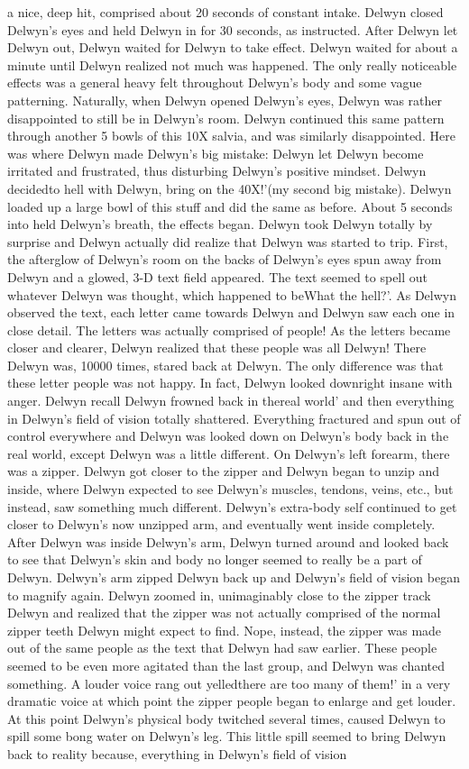 \documentclass[12pt]{book}
\begin{document}
a nice, deep hit, comprised about 20 seconds of constant intake. Delwyn closed Delwyn's eyes and held Delwyn in for 30 seconds, as instructed. After Delwyn let Delwyn out, Delwyn waited for Delwyn to take effect. Delwyn waited for about a minute until Delwyn realized not much was happened. The only really noticeable effects was a general heavy felt throughout Delwyn's body and some vague patterning. Naturally, when Delwyn opened Delwyn's eyes, Delwyn was rather disappointed to still be in Delwyn's room. Delwyn continued this same pattern through another 5 bowls of this 10X salvia, and was similarly disappointed. Here was where Delwyn made Delwyn's big mistake: Delwyn let Delwyn become irritated and frustrated, thus disturbing Delwyn's positive mindset. Delwyn decidedto hell with Delwyn, bring on the 40X!'(my second big mistake). Delwyn loaded up a large bowl of this stuff and did the same as before. About 5 seconds into held Delwyn's breath, the effects began. Delwyn took Delwyn totally by surprise and Delwyn actually did realize that Delwyn was started to trip. First, the afterglow of Delwyn's room on the backs of Delwyn's eyes spun away from Delwyn and a glowed, 3-D text field appeared. The text seemed to spell out whatever Delwyn was thought, which happened to beWhat the hell?'. As Delwyn observed the text, each letter came towards Delwyn and Delwyn saw each one in close detail. The letters was actually comprised of people! As the letters became closer and clearer, Delwyn realized that these people was all Delwyn! There Delwyn was, 10000 times, stared back at Delwyn. The only difference was that these letter people was not happy. In fact, Delwyn looked downright insane with anger. Delwyn recall Delwyn frowned back in thereal world' and then everything in Delwyn's field of vision totally shattered. Everything fractured and spun out of control everywhere and Delwyn was looked down on Delwyn's body back in the real world, except Delwyn was a little different. On Delwyn's left forearm, there was a zipper. Delwyn got closer to the zipper and Delwyn began to unzip and inside, where Delwyn expected to see Delwyn's muscles, tendons, veins, etc., but instead, saw something much different. Delwyn's extra-body self continued to get closer to Delwyn's now unzipped arm, and eventually went inside completely. After Delwyn was inside Delwyn's arm, Delwyn turned around and looked back to see that Delwyn's skin and body no longer seemed to really be a part of Delwyn. Delwyn's arm zipped Delwyn back up and Delwyn's field of vision began to magnify again. Delwyn zoomed in, unimaginably close to the zipper track Delwyn and realized that the zipper was not actually comprised of the normal zipper teeth Delwyn might expect to find. Nope, instead, the zipper was made out of the same people as the text that Delwyn had saw earlier. These people seemed to be even more agitated than the last group, and Delwyn was chanted something. A louder voice rang out yelledthere are too many of them!' in a very dramatic voice at which point the zipper people began to enlarge and get louder. At this point Delwyn's physical body twitched several times, caused Delwyn to spill some bong water on Delwyn's leg. This little spill seemed to bring Delwyn back to reality because, everything in Delwyn's field of vision 
\end{document}
